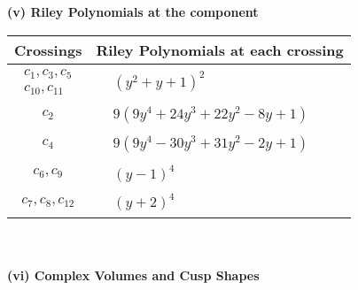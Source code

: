 \documentclass[1p]{elsarticle_modified}
\theoremstyle{definition}
\begin{document}
\newpage\renewcommand{\arraystretch}{1}
\flushleft \textbf{(v) Riley Polynomials at the component}\newline \\
\begin{tabular}{m{50pt}|m{274pt}}
Crossings & \hspace{64pt}Riley Polynomials at each crossing \\
\hline $$\begin{aligned}c_{1},c_{3},c_{5}\\c_{10},c_{11}\end{aligned}$$&$\begin{aligned}
&(y^2+y+1)^2
\end{aligned}$\\
\hline $$\begin{aligned}c_{2}\end{aligned}$$&$\begin{aligned}
&9(9 y^4+24 y^3+22 y^2-8 y+1)
\end{aligned}$\\
\hline $$\begin{aligned}c_{4}\end{aligned}$$&$\begin{aligned}
&9(9 y^4-30 y^3+31 y^2-2 y+1)
\end{aligned}$\\
\hline $$\begin{aligned}c_{6},c_{9}\end{aligned}$$&$\begin{aligned}
&(y-1)^4
\end{aligned}$\\
\hline $$\begin{aligned}c_{7},c_{8},c_{12}\end{aligned}$$&$\begin{aligned}
&(y+2)^4
\end{aligned}$\\
\hline
\end{tabular}\\~\\
\newpage\flushleft \textbf{(vi) Complex Volumes and Cusp Shapes}
\end{document}
